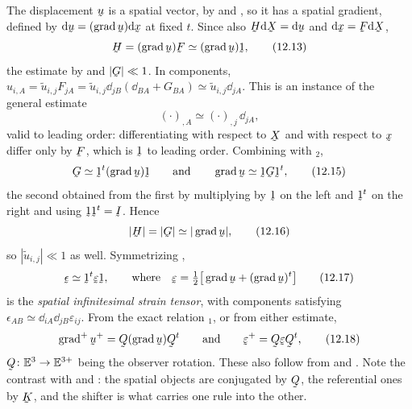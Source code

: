 The displacement $\bu$ is a spatial vector, by  and
, so it has a spatial gradient, defined by
$\dl\bu=(\grad\bu)\dl\bx$ at fixed $t$. Since also $\bH\dl\bX=\dl\bu$
and $\dl\bx=\bF\dl\bX$,
\begin{equation}
   \bH=(\grad\bu)\bF\simeq(\grad\bu)\shift ,
   \tag{12.13}\label{eq:12.13}
\end{equation}
the estimate by  and $|\bG|\ll1$. In components,
$\hat u_{i,A}=\tilde u_{i,j}F_{jA}=\tilde u_{i,j}\dd_{jB}
(\dd_{BA}+G_{BA})\simeq\tilde u_{i,j}\dd_{jA}$. This is an instance of
the general estimate
\begin{equation}
   (\cdot)_{,A}\simeq(\cdot)_{,j}\,\dd_{jA},
   \tag{12.14}\label{eq:12.14}
\end{equation}
valid to leading order: differentiating with respect to $\bX$ and with
respect to $\bx$ differ only by $\bF$, which is $\shift$ to leading
order. Combining  with $_{2}$,
\begin{equation}
   \bG\simeq\shift^{t}(\grad\bu)\shift
   \qquad\text{and}\qquad
   \grad\bu\simeq\shift\bG\shift^{t},
   \tag{12.15}\label{eq:12.15}
\end{equation}
the second obtained from the first by multiplying by $\shift$ on the
left and $\shift^{t}$ on the right and using $\shift\shift^{t}=\I$.
Hence
\begin{equation}
   |\bH|=|\bG|\simeq|\grad\bu| ,
   \tag{12.16}\label{eq:12.16}
\end{equation}
so $|\tilde u_{i,j}|\ll1$ as well. Symmetrizing ,
\begin{equation}
   \vek{\epsilon}\simeq\shift^{t}\vek{\varepsilon}\shift,
   \qquad\text{where}\quad
   \vek{\varepsilon}=\tfrac12\big[\grad\bu+(\grad\bu)^{t}\big]
   \tag{12.17}\label{eq:12.17}
\end{equation}
is the \emph{spatial infinitesimal strain tensor}, with components
satisfying $\epsilon_{AB}\simeq\dd_{iA}\dd_{jB}\varepsilon_{ij}$. From
the exact relation $_{1}$, or from either estimate,
\begin{equation}
   \grad^{+}\bu^{+}=\bQ(\grad\bu)\bQ^{t}
   \qquad\text{and}\qquad
   \vek{\varepsilon}^{+}=\bQ\vek{\varepsilon}\bQ^{t},
   \tag{12.18}\label{eq:12.18}
\end{equation}
$\bQ\colon\Vt\to\mathbb{E}^{3+}$ being the observer rotation. These also follow
from  and . Note the contrast with  and
: the spatial objects are conjugated by $\bQ$, the
referential ones by $\bK$, and the shifter is what carries one rule into
the other.

